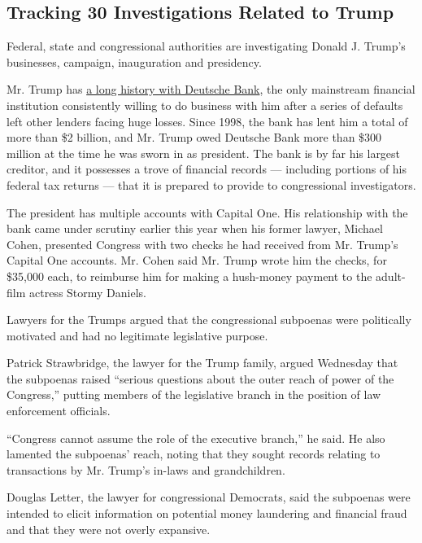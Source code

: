 \hypertarget{tracking-30-investigations-related-to-trump}{%
\subsection{Tracking 30 Investigations Related to
Trump}\label{tracking-30-investigations-related-to-trump}}

Federal, state and congressional authorities are investigating Donald J.
Trump's businesses, campaign, inauguration and presidency.

Mr. Trump has
\href{https://www.nytimes3xbfgragh.onion/2019/03/18/business/trump-deutsche-bank.html?module=inline}{a
long history with Deutsche Bank}, the only mainstream financial
institution consistently willing to do business with him after a series
of defaults left other lenders facing huge losses. Since 1998, the bank
has lent him a total of more than \$2 billion, and Mr. Trump owed
Deutsche Bank more than \$300 million at the time he was sworn in as
president. The bank is by far his largest creditor, and it possesses a
trove of financial records --- including portions of his federal tax
returns --- that it is prepared to provide to congressional
investigators.

The president has multiple accounts with Capital One. His relationship
with the bank came under scrutiny earlier this year when his former
lawyer, Michael Cohen, presented Congress with two checks he had
received from Mr. Trump's Capital One accounts. Mr. Cohen said Mr. Trump
wrote him the checks, for \$35,000 each, to reimburse him for making a
hush-money payment to the adult-film actress Stormy Daniels.

Lawyers for the Trumps argued that the congressional subpoenas were
politically motivated and had no legitimate legislative purpose.

Patrick Strawbridge, the lawyer for the Trump family, argued Wednesday
that the subpoenas raised ``serious questions about the outer reach of
power of the Congress,'' putting members of the legislative branch in
the position of law enforcement officials.

``Congress cannot assume the role of the executive branch,'' he said. He
also lamented the subpoenas' reach, noting that they sought records
relating to transactions by Mr. Trump's in-laws and grandchildren.

Douglas Letter, the lawyer for congressional Democrats, said the
subpoenas were intended to elicit information on potential money
laundering and financial fraud and that they were not overly expansive.

